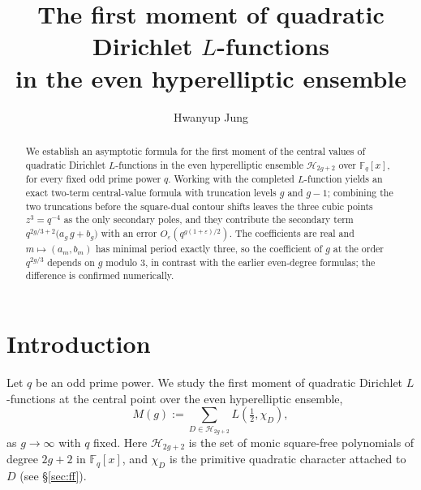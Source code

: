 \documentclass[a4paper,reqno]{amsart}
\title[The first moment over the even hyperelliptic ensemble]
{The first moment of quadratic Dirichlet $L$-functions \\
in the even hyperelliptic ensemble}
\author{Hwanyup Jung}
\numberwithin{equation}{section}
\theoremstyle{remark}
\theoremstyle{definition}
\begin{document}
\setlength{\abovedisplayskip}{4pt plus 2pt minus 1pt}
\setlength{\belowdisplayskip}{4pt plus 2pt minus 1pt}
\setlength{\abovedisplayshortskip}{1pt plus 1pt}
\setlength{\belowdisplayshortskip}{2pt plus 1pt minus 1pt}

\begin{abstract}
We establish an asymptotic formula for the first moment of the central values
of quadratic Dirichlet $L$-functions in the even hyperelliptic ensemble
$\mathcal H_{2g+2}$ over $\mathbb F_q[x]$, for every fixed odd prime power $q$.
Working with the completed $L$-function yields an exact two-term central-value
formula with truncation levels $g$ and $g-1$; combining the two truncations
before the square-dual contour shifts leaves the three cubic points
$z^3=q^{-4}$ as the only secondary poles, and they contribute the secondary
term $q^{2g/3+2}\bigl(a_g\,g+b_g\bigr)$ with an error
$O_\varepsilon(q^{g(1+\varepsilon)/2})$. The coefficients are real and
$m\mapsto(a_m,b_m)$ has minimal period exactly three, so the coefficient of
$g$ at the order $q^{2g/3}$ depends on $g$ modulo $3$, in contrast with the
earlier even-degree formulas; the difference is confirmed numerically.
\end{abstract}


\maketitle


\section{Introduction}\label{sec:intro}

Let $q$ be an odd prime power.  We study the first moment of quadratic Dirichlet
$L$-functions at the central point over the even hyperelliptic ensemble,
\begin{equation}\label{eq:moment_intro}
M(g)
:=
\sum_{D\in\mathcal H_{2g+2}}
L\!\left(\tfrac12,\chi_D\right),
\end{equation}
as $g\to\infty$ with $q$ fixed.  Here $\mathcal H_{2g+2}$ is the set of monic square-free
polynomials of degree $2g+2$ in $\mathbb F_q[x]$, and $\chi_D$ is the primitive quadratic
character attached to $D$ (see \S\ref{sec:ff}).
\end{document}
